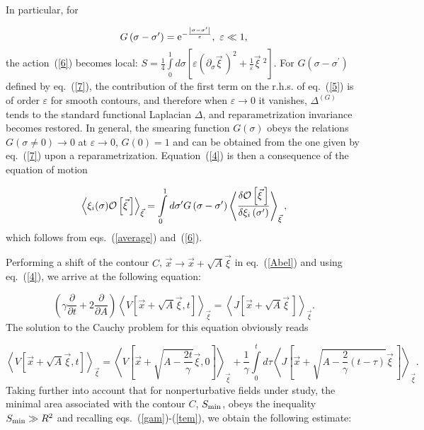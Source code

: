 \documentclass[a4paper,12pt]{article}
\begin{document}
In particular, for

\begin{equation}
\label{7}
G\left(\sigma-\sigma^\prime\right)={\rm e}^{-\frac{\left|\sigma-
\sigma^\prime\right|}
{\varepsilon}},~
\varepsilon\ll 1,
\end{equation}
the action~(\ref{6}) becomes local: $S=\frac{1}{4}\int\limits_0^1
d\sigma\left[\varepsilon\left(\partial_\sigma\vec\xi{\,}\right)^2+\frac{1}{\varepsilon}
{\vec\xi}{\:}^2\right]$. For $G\left
(\sigma-\sigma^\prime\right)$ defined
by eq.~(\ref{7}), the contribution of the first term on the r.h.s. of eq.~(\ref{5}) is of
order $\varepsilon$ for smooth contours, and therefore
when $\varepsilon\to 0$ it vanishes,
$\Delta^{(G)}$ tends to the standard functional Laplacian
$\Delta$, and reparametrization invariance becomes restored. In general, the smearing function
$G(\sigma)$ obeys the relations $G(\sigma\ne 0)\to 0$ at $\varepsilon\to 0$, $G(0)=1$ and
can be obtained from the one given by eq.~(\ref{7}) upon a reparametrization.
Equation~(\ref{4}) is then a consequence of the equation of motion

\begin{equation}
\label{eqm}
\left<\xi_i(\sigma){\cal O}\left[\vec\xi{\,}\right]\right>_{\vec\xi}=
\int\limits_0^1 d\sigma^\prime G\left(\sigma-\sigma^\prime\right)\left<\frac{
\delta{\cal O}\left[\vec\xi{\,}\right]}{\delta\xi_i\left(\sigma^\prime
\right)}\right>_{\vec\xi},
\end{equation}
which follows from eqs.~(\ref{average}) and~(\ref{6}).

Performing a shift of the contour $C$, $\vec x\to\vec x+\sqrt{A}\vec \xi$
in eq.~(\ref{Abel}) and using eq.~(\ref{4}), we arrive at the following
equation:

$$
\left(\gamma\frac{\partial}{\partial t}+2\frac{\partial}{\partial A}\right)
\left<V\left[\vec x+\sqrt{A}\vec\xi, t\right]\right>_{\vec\xi}=\left<J\left[\vec x+\sqrt{A}\vec\xi{\,}
\right]\right>_{\vec\xi}.$$
The solution to the Cauchy problem for this equation obviously reads

$$
\left<V\left[\vec x+\sqrt{A}\vec\xi, t\right]\right>_{\vec\xi}=
\left<V\left[\vec x+\sqrt{A-\frac{2t}{\gamma}}\vec\xi, 0\right]\right>_{\vec\xi}+\frac{1}{\gamma}
\int\limits_{0}^{t}d\tau\left<J\left[\vec x+\sqrt{A-\frac{2}{\gamma}(t-\tau)}\vec\xi{\,}\right]\right>_{\vec\xi}.$$
Taking further into account that for nonperturbative fields under study,
the minimal area associated with the contour $C$, $S_{\rm min}$, obeys the inequality
$S_{\rm min}\gg R^2$ and recalling eqs.~(\ref{gam})-(\ref{tem}), we obtain the following estimate:
\end{document}
